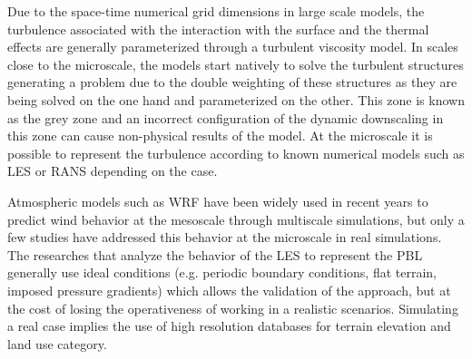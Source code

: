 Due to the space-time numerical grid dimensions in large scale models, the turbulence associated with the interaction with the surface and the thermal effects are generally parameterized through a turbulent viscosity model. In scales close to the microscale, the models start natively to solve the turbulent structures generating a problem due to the double weighting of these structures as they are being solved on the one hand and parameterized on the other. This zone is known as the grey zone \citep{Wyngaard2004} and an incorrect configuration of the dynamic downscaling in this zone can cause non-physical results of the model. At the microscale it is possible to represent the turbulence according to known numerical models such as LES or RANS depending on the case.

Atmospheric models such as WRF have been widely used in recent years to predict wind behavior at the mesoscale through multiscale simulations, but only a few studies have addressed this behavior at the microscale in real simulations. The researches that analyze the behavior of the LES to represent the PBL generally use ideal conditions (e.g. periodic boundary conditions, flat terrain, imposed pressure gradients) which allows the validation of the approach, but at the cost of losing the operativeness of working in a realistic scenarios. Simulating a real case implies the use of high resolution databases for terrain elevation and land use category.

